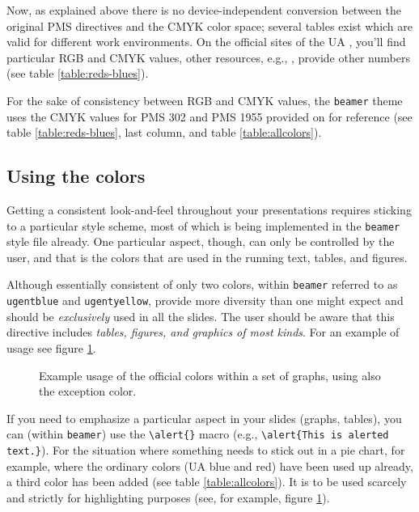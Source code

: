 \documentclass[a4paper,10pt]{article}
\newlength{\figurewidth}
\newlength{\figureheight}
\begin{document}
Now, as explained above there is no device-independent conversion between the original PMS directives and the CMYK color space; several tables exist which are valid for different work environments. On the official sites of the UA \cite{KAN::}, you'll find particular RGB and CMYK values, other resources, e.g., \cite{::TDC}, provide other numbers (see table \ref{table:reds-blues}).

For the sake of consistency between RGB and CMYK values, the \texttt{beamer} theme uses the CMYK values for PMS 302 and PMS 1955 provided on \cite{::TDC} for reference (see table \ref{table:reds-blues}, last column, and table \ref{table:allcolors}).

\subsection{Using the colors}\label{subsection:usingthecolors}


Getting a consistent look-and-feel throughout your presentations requires sticking to a particular style scheme, most of which is being implemented in the \texttt{beamer} style file already. One particular aspect, though, can only be controlled by the user, and that is the colors that are used in the running text, tables, and figures.

Although essentially consistent of only two colors, within \texttt{beamer} referred to as \lstinline!ugentblue! and \lstinline!ugentyellow!, provide more diversity than one might expect and should be  \emph{exclusively} used  in all the slides. The user should be aware that this directive includes \emph{tables, figures, and graphics of most kinds}. For an example of usage see figure \ref{fig:coloredgraphs}.

\begin{figure}
\setlength{\figurewidth}{10cm}
\setlength{\figureheight}{5cm}
\centering
%
\caption{Example usage of the official colors within a set of graphs, using also the exception color.}
\label{fig:coloredgraphs}
\end{figure}

If you need to emphasize a particular aspect in your slides (graphs, tables), you can (within \texttt{beamer}) use the \lstinline!\alert{}! macro (e.g., \lstinline!\alert{This is alerted text.}!). For the situation where something needs to stick out in a pie chart, for example, where the ordinary colors (UA blue and red) have been used up already, a third color has been added (see table \ref{table:allcolors}). It is to be used scarcely and strictly for highlighting purposes (see, for example, figure \ref{fig:coloredgraphs}).
\end{document}
